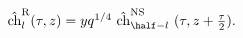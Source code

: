 \begin{equation} \label{spectral-flow}
  \begin{array}{l}
\hat{\rm ch}^{\rm R}_l(\tau,z) = yq^{1/4} ~\hat{\rm ch}^{\rm
  NS}_{\half-l}~(\tau,z+{\tau\over 2}).
  \end{array}
\end{equation}

